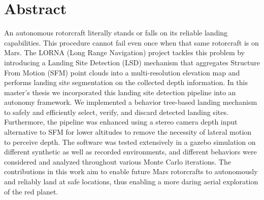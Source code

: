 \chapter*{Abstract}

An autonomous rotorcraft literally stands or falls on its reliable landing capabilities. This procedure cannot fail even once when that same rotorcraft is on Mars. The LORNA (Long Range Navigation) project tackles this problem by introducing a Landing Site Detection (LSD) mechanism that aggregates Structure From Motion (SFM) point clouds into a multi-resolution elevation map and performs landing site segmentation on the collected depth information. In this master's thesis we incorporated this landing site detection pipeline into an autonomy framework. We implemented a behavior tree-based landing mechanism to safely and efficiently select, verify, and discard detected landing sites. Furthermore, the pipeline was enhanced using a stereo camera depth input alternative to SFM for lower altitudes to remove the necessity of lateral motion to perceive depth. The software was tested extensively in a gazebo simulation on different synthetic as well as recorded environments, and different behaviors were considered and analyzed throughout various Monte Carlo iterations. The contributions in this work aim to enable future Mars rotorcrafts to autonomously and reliably land at safe locations, thus enabling a more daring aerial exploration of the red planet.